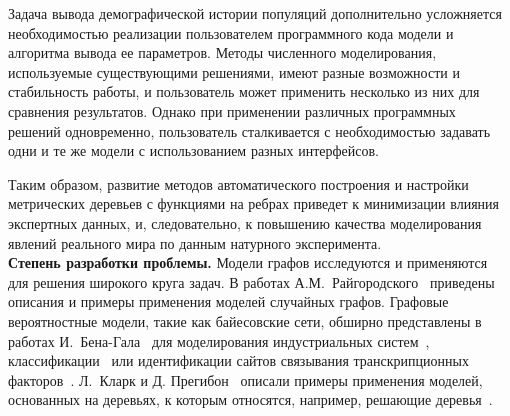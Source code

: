 Задача вывода демографической истории популяций дополнительно усложняется необходимостью реализации пользователем программного кода модели и алгоритма вывода ее параметров.
Методы численного моделирования, используемые существующими решениями, имеют разные возможности и стабильность работы, и пользователь может применить несколько из них для сравнения результатов.
Однако при применении различных программных решений одновременно, пользователь сталкивается с необходимостью задавать одни и те же модели с использованием разных интерфейсов.

Таким образом, развитие методов автоматического построения и настройки метрических деревьев с функциями на ребрах приведет к минимизации влияния экспертных данных, и, следовательно, к повышению качества моделирования явлений реального мира по данным натурного эксперимента.\\





\textbf{Степень разработки проблемы.}
Модели графов исследуются и применяются для решения широкого круга задач.
В работах А.М.~Райгородского~\cite{райгородский2010модели,райгородский2022модели} приведены описания и примеры применения моделей случайных графов.
Графовые вероятностные модели, такие как байесовские сети, обширно представлены в работах И.~Бена-Гала~\cite{ben2008bayesian} для моделирования индустриальных систем~\cite{gruber2012efficient}, классификации~\cite{gruber2019targeted} или идентификации сайтов связывания транскрипционных факторов~\cite{ben2005identification}.
Л.~Кларк и Д. Прегибон~\cite{clark2017tree} описали примеры применения моделей, основанных на деревьях, к которым относятся, например, решающие деревья~\cite{kotsiantis2013decision}.


